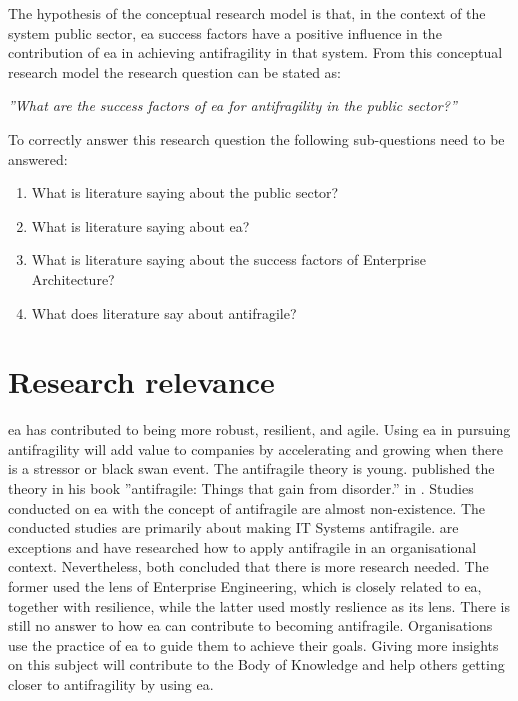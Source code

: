 The hypothesis of the conceptual research model is that, in the context of the system public sector, \acrlong{ea} success factors have a positive influence in the contribution of \acrlong{ea} in achieving antifragility in that system. From this conceptual research model the research question can be stated as:\bigskip

\noindent \emph{''What are the success factors of \acrlong{ea} for \gls{antifragility} in the public sector?''}\bigskip

\noindent To correctly answer this research question the following sub-questions need to be answered:

\begin{enumerate}
	\item{What is literature saying about the public sector?}
	\item{What is literature saying about \acrlong{ea}?}
	\item{What is literature saying about the success factors of Enterprise Architecture?}
	\item{What does literature say about antifragile?}
\end{enumerate}
\section{Research relevance}
\label{sec:researchrelevance}

\acrfull{ea} has contributed to being more \gls{robust}, \gls{resilient}, and \gls{agile}. Using \acrshort{ea} in pursuing \gls{antifragility} will add value to companies by accelerating and growing when there is a stressor or black swan event. The \gls{antifragile} theory is young.  \citeauthor{Taleb2012} published the theory in his book ''\Gls{antifragile}: Things that gain from disorder.'' in \citeyear{Taleb2012}.  Studies conducted on \acrshort{ea} with the concept of \gls{antifragile} are almost non-existence. The conducted studies are primarily about making IT Systems \gls{antifragile}. \textcite{Botjes2020,Kastner2017} are exceptions and have researched how to apply \gls{antifragile} in an organisational context. Nevertheless, both concluded that there is more research needed. The former used the lens of Enterprise Engineering, which is closely related to \acrshort{ea}, together with resilience, while the latter used mostly reslience as its lens. There is still no answer to how \acrshort{ea} can contribute to becoming \gls{antifragile}. Organisations use the practice of \acrshort{ea} to guide them to achieve their goals. Giving more insights on this subject will contribute to the Body of Knowledge and help others getting closer to \gls{antifragility} by using \acrshort{ea}.

